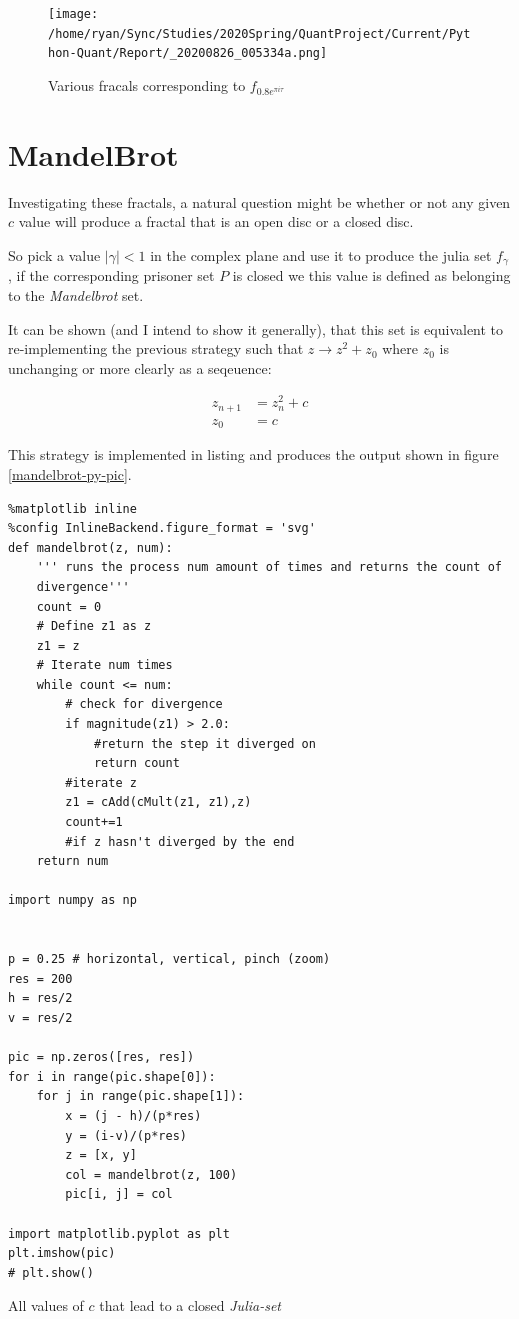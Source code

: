 \documentclass[11pt]{article}
\begin{document}
\begin{figure}[htbp]
\centering
\texttt{[image: /home/ryan/Sync/Studies/2020Spring/QuantProject/Current/Python-Quant/Report/\_20200826\_005334a.png]}
\caption{\label{montage-frac}Various fracals corresponding to \(f_{0.8 e^{\pi i \tau}}\)}
\end{figure}

\section{MandelBrot}
\label{sec:orgb816c41}
Investigating these fractals, a natural question might be whether or not any
given \(c\) value will produce a fractal that is an open disc or a closed disc.

So pick a value \(\left\lvert \gamma \right \rvert < 1\) in the complex plane and
use it to produce the julia set \(f_{\gamma}\), if the corresponding prisoner set
\(P\) is closed we this value is defined as belonging to the \emph{Mandelbrot} set.

It can be shown (and I intend to show it generally), that this set is equivalent to re-implementing the previous strategy such that \(z \rightarrow z^{2} + z_{0}\) where \(z_{0}\) is unchanging or more clearly as a seqeuence:

\begin{align}
z_{n+1} &= z^{2}_n + c \label{eq:mb-sequence} \\
z_{0}   &= c
\end{align}

This strategy is implemented in listing and produces the output shown in figure \ref{mandelbrot-py-pic}.

\begin{listing}[htbp]
\begin{verbatim}
%matplotlib inline
%config InlineBackend.figure_format = 'svg'
def mandelbrot(z, num):
    ''' runs the process num amount of times and returns the count of
    divergence'''
    count = 0
    # Define z1 as z
    z1 = z
    # Iterate num times
    while count <= num:
        # check for divergence
        if magnitude(z1) > 2.0:
            #return the step it diverged on
            return count
        #iterate z
        z1 = cAdd(cMult(z1, z1),z)
        count+=1
        #if z hasn't diverged by the end
    return num

import numpy as np


p = 0.25 # horizontal, vertical, pinch (zoom)
res = 200
h = res/2
v = res/2

pic = np.zeros([res, res])
for i in range(pic.shape[0]):
    for j in range(pic.shape[1]):
        x = (j - h)/(p*res)
        y = (i-v)/(p*res)
        z = [x, y]
        col = mandelbrot(z, 100)
        pic[i, j] = col

import matplotlib.pyplot as plt
plt.imshow(pic)
# plt.show()
\end{verbatim}
\caption{\label{py-mandelbrot-code}All values of \(c\) that lead to a closed \emph{Julia-set}}
\end{listing}
\end{document}

